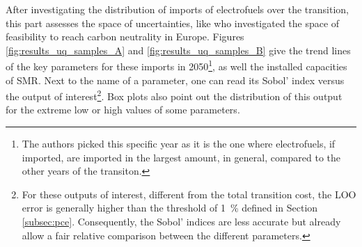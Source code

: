 After investigating the distribution of imports of electrofuels over the transition, this part assesses the space of uncertainties, like \citet{pickering2022diversity} who investigated the space of feasibility to reach carbon neutrality in Europe. Figures \ref{fig:results_uq_samples_A} and \ref{fig:results_uq_samples_B} give the trend lines of the key parameters for these imports in 2050\footnote{The authors picked this specific year as it is the one where electrofuels, if imported, are imported in the largest amount, in general, compared to the other years of the transiton.}, as well the installed capacities of \gls{SMR}. Next to the name of a parameter, one can read its Sobol' index versus the output of interest\footnote{For these outputs of interest, different from the total transition cost, the \gls{LOO} error is generally higher than the threshold of \SI{1}{\%} defined in Section \ref{subsec:pce}. Consequently, the Sobol' indices are less accurate but already allow a fair relative comparison between the different parameters.}. Box plots also point out the distribution of this output for the extreme low or high values of some parameters.

